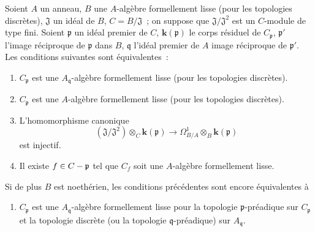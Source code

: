 \begin{proposition}[22.6.4]
\label{0.22.6.4-fr}
Soient $A$ un anneau, $B$ une $A$-algèbre formellement lisse (pour les
topologies discrètes), $\mathfrak J$ un idéal de $B$, $C=B/\mathfrak J$~; on
suppose que $\mathfrak J/\mathfrak J^2$ est un $C$-module de type fini. Soient
$\mathfrak p$ un idéal premier de $C$, $\boldsymbol{k}(\mathfrak p)$ le corps résiduel de
$C_{\mathfrak p}$, $\mathfrak p'$ l'image réciproque de $\mathfrak p$ dans
$B$, $\mathfrak q$ l'idéal premier de $A$ image réciproque de $\mathfrak p'$.
Les conditions suivantes sont équivalentes~:
\begin{enumerate}
  \item[\textup{a)}] $C_{\mathfrak p}$ est une $A_{\mathfrak q}$-algèbre formellement
  lisse (pour les topologies discrètes).
  \item[\textup{a')}] $C_{\mathfrak p}$ est une $A$-algèbre formellement lisse (pour
  les topologies discrètes).
  \item[\textup{b)}] L'homomorphisme canonique
  \begin{equation}
  \label{0.22.6.4.1-fr}
    (\mathfrak J/\mathfrak J^2)\otimes_C\boldsymbol{k}(\mathfrak p)
    \longrightarrow\Omega^1_{B/A}\otimes_B\boldsymbol{k}(\mathfrak p)
    \tag{22.6.4.1}
  \end{equation}
  est injectif.
  \item[\textup{c)}] Il existe $f\in C-\mathfrak p$ tel que $C_f$ soit une
  $A$-algèbre formellement lisse.
\end{enumerate}
Si de plus $B$ est noethérien, les conditions précédentes sont encore
équivalentes à
\begin{enumerate}
  \item[\textup{d)}] $C_{\mathfrak p}$ est une $A_{\mathfrak q}$-algèbre formellement
  lisse pour la topologie $\mathfrak p$-préadique sur $C_{\mathfrak p}$ et la
  topologie discrète (ou la topologie $\mathfrak q$-préadique) sur
  $A_{\mathfrak q}$.
\end{enumerate}
\end{proposition}


